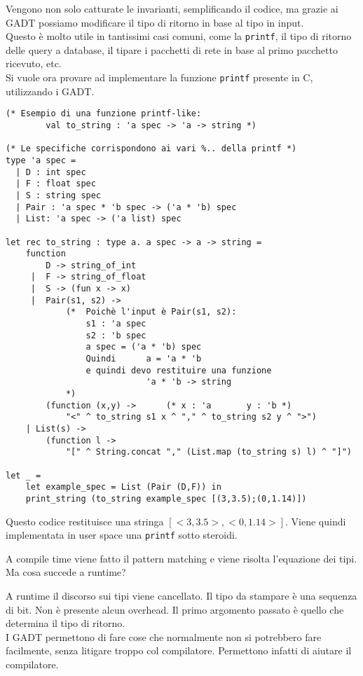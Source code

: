 \documentclass{article}
\begin{document}
Vengono non solo catturate le invarianti, semplificando il codice, ma grazie ai GADT possiamo modificare il tipo di ritorno in base al tipo in input.\\
Questo è molto utile in tantissimi casi comuni, come la \texttt{printf}, il tipo di ritorno delle query a database, il tipare i pacchetti di rete in base al primo pacchetto ricevuto, etc.\vspace{14pt}\\
Si vuole ora provare ad implementare la funzione \texttt{printf} presente in C, utilizzando i GADT.
\begin{tcolorbox}
\begin{verbatim}
(* Esempio di una funzione printf-like:     
        val to_string : 'a spec -> 'a -> string *)

(* Le specifiche corrispondono ai vari %.. della printf *)
type 'a spec =
  | D : int spec
  | F : float spec
  | S : string spec
  | Pair : 'a spec * 'b spec -> ('a * 'b) spec
  | List: 'a spec -> ('a list) spec

let rec to_string : type a. a spec -> a -> string =
    function
        D -> string_of_int
     |  F -> string_of_float
     |  S -> (fun x -> x)
     |  Pair(s1, s2) ->
            (*  Poichè l'input è Pair(s1, s2):
                s1 : 'a spec
                s2 : 'b spec
                a spec = ('a * 'b) spec
                Quindi      a = 'a * 'b
                e quindi devo restituire una funzione   
                            'a * 'b -> string
            *)
        (function (x,y) ->      (* x : 'a       y : 'b *)
            "<" ^ to_string s1 x ^ "," ^ to_string s2 y ^ ">")
    | List(s) ->
        (function l ->
            "[" ^ String.concat "," (List.map (to_string s) l) ^ "]")

let _ =
    let example_spec = List (Pair (D,F)) in
    print_string (to_string example_spec [(3,3.5);(0,1.14)])
\end{verbatim}
\end{tcolorbox}
Questo codice restituisce una stringa \texttt{$[<3, 3.5>, <0, 1.14>]$}. Viene quindi implementata in user space una \texttt{printf} sotto steroidi.

A compile time viene fatto il pattern matching e viene risolta l'equazione dei tipi.\\
Ma cosa succede a runtime?

A runtime il discorso sui tipi viene cancellato. Il tipo da stampare è una sequenza di bit. Non è presente alcun overhead. Il primo argomento passato è quello che determina il tipo di ritorno.\vspace{14pt}\\
I GADT permettono di fare cose che normalmente non si potrebbero fare facilmente, senza litigare troppo col compilatore. Permettono infatti di aiutare il compilatore.
\end{document}
